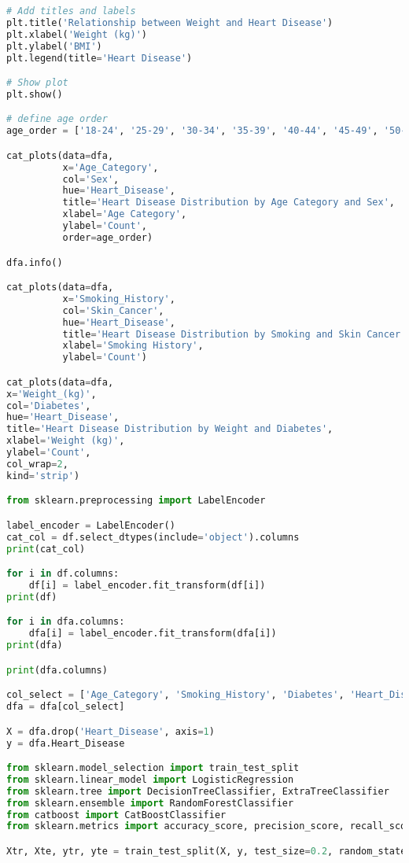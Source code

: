 \documentclass[12pt, a4paper,twoside]{report}
\numberwithin{equation}{chapter}
\begin{document}
\begin{lstlisting}[language=Python]
# Add titles and labels
plt.title('Relationship between Weight and Heart Disease')
plt.xlabel('Weight (kg)')
plt.ylabel('BMI')
plt.legend(title='Heart Disease')

# Show plot
plt.show()

# define age order
age_order = ['18-24', '25-29', '30-34', '35-39', '40-44', '45-49', '50-54', '55-59', '60-64', '65-69', '70-74', '75-79', '80+']

cat_plots(data=dfa, 
          x='Age_Category', 
          col='Sex', 
          hue='Heart_Disease', 
          title='Heart Disease Distribution by Age Category and Sex', 
          xlabel='Age Category',
          ylabel='Count',
          order=age_order)

dfa.info()

cat_plots(data=dfa, 
          x='Smoking_History', 
          col='Skin_Cancer', 
          hue='Heart_Disease', 
          title='Heart Disease Distribution by Smoking and Skin Cancer', 
          xlabel='Smoking History',
          ylabel='Count')

cat_plots(data=dfa, 
x='Weight_(kg)', 
col='Diabetes', 
hue='Heart_Disease', 
title='Heart Disease Distribution by Weight and Diabetes', 
xlabel='Weight (kg)',
ylabel='Count',
col_wrap=2,
kind='strip')

from sklearn.preprocessing import LabelEncoder

label_encoder = LabelEncoder()
cat_col = df.select_dtypes(include='object').columns
print(cat_col)

for i in df.columns:
    df[i] = label_encoder.fit_transform(df[i])
print(df)

for i in dfa.columns:
    dfa[i] = label_encoder.fit_transform(dfa[i])
print(dfa)

print(dfa.columns)

col_select = ['Age_Category', 'Smoking_History', 'Diabetes', 'Heart_Disease', 'Exercise', 'Sex', 'BMI']
dfa = dfa[col_select]

X = dfa.drop('Heart_Disease', axis=1)
y = dfa.Heart_Disease

from sklearn.model_selection import train_test_split
from sklearn.linear_model import LogisticRegression
from sklearn.tree import DecisionTreeClassifier, ExtraTreeClassifier
from sklearn.ensemble import RandomForestClassifier
from catboost import CatBoostClassifier
from sklearn.metrics import accuracy_score, precision_score, recall_score, f1_score, balanced_accuracy_score, roc_auc_score

Xtr, Xte, ytr, yte = train_test_split(X, y, test_size=0.2, random_state=728)


\end{lstlisting}
\end{document}
